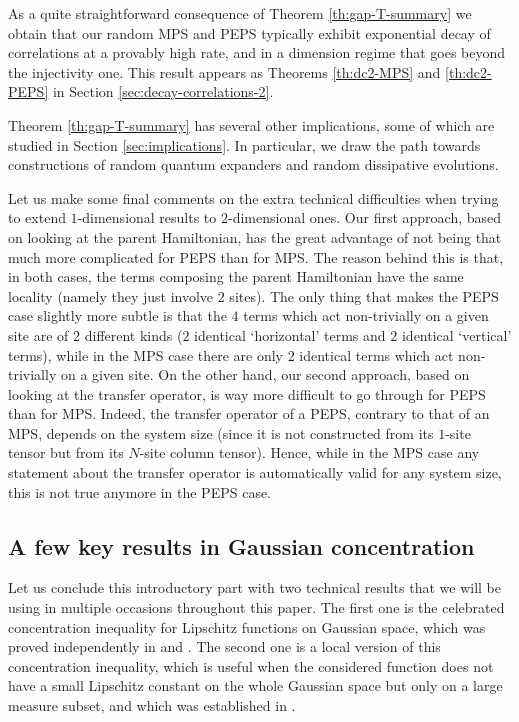 \documentclass{amsart}
\begin{document}
As a quite straightforward consequence of Theorem \ref{th:gap-T-summary} we obtain that our random MPS and PEPS typically exhibit exponential decay of correlations at a provably high rate, and in a dimension regime that goes beyond the injectivity one. This result appears as Theorems \ref{th:dc2-MPS} and \ref{th:dc2-PEPS} in Section \ref{sec:decay-correlations-2}.

Theorem \ref{th:gap-T-summary} has several other implications, some of which are studied in Section \ref{sec:implications}. In particular, we draw the path towards constructions of random quantum expanders and random dissipative evolutions.

Let us make some final comments on the extra technical difficulties when trying to extend $1$-dimensional results to $2$-dimensional ones. Our first approach, based on looking at the parent Hamiltonian, has the great advantage of not being that much more complicated for PEPS than for MPS. The reason behind this is that, in both cases, the terms composing the parent Hamiltonian have the same locality (namely they just involve $2$ sites). The only thing that makes the PEPS case slightly more subtle is that the $4$ terms which act non-trivially on a given site are of $2$ different kinds ($2$ identical `horizontal' terms and $2$ identical `vertical' terms), while in the MPS case there are only $2$ identical terms which act non-trivially on a given site. On the other hand, our second approach, based on looking at the transfer operator, is way more difficult to go through for PEPS than for MPS. Indeed, the transfer operator of a PEPS, contrary to that of an MPS, depends on the system size (since it is not constructed from its $1$-site tensor but from its $N$-site column tensor). Hence, while in the MPS case any statement about the transfer operator is automatically valid for any system size, this is not true anymore in the PEPS case.

\subsection{A few key results in Gaussian concentration} \hfill\par\smallskip

Let us conclude this introductory part with two technical results that we will be using in multiple occasions throughout this paper. The first one is the celebrated concentration inequality for Lipschitz functions on Gaussian space, which was proved independently in \cite{Bor} and \cite{ST}. The second one is a local version of this concentration inequality, which is useful when the considered function does not have a small Lipschitz constant on the whole Gaussian space but only on a large measure subset, and which was established in \cite{ASW}.
\end{document}
